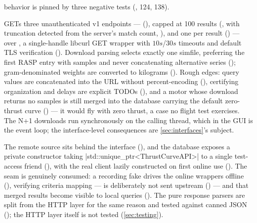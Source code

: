 \begin{description}
  behavior is pinned by three negative tests (, 124,
  138).
\item[thrustcurve.org REST --- \fpartial.]  GETs three unauthenticated v1
  endpoints ---  (),
   capped at 100 results (, with truncation
  detected from the server's match count, ), and one
   per result () --- over
  , a single-handle libcurl GET wrapper with $10\unit{s}$/$30\unit{s}$
  timeouts and default TLS verification (). Download parsing
  selects exactly one simfile, preferring the first RASP entry with samples and never concatenating
  alternative series (); gram-denominated weights are
  converted to kilograms (). Rough edges: query values are
  concatenated into the URL without percent-encoding (),
  certifying organization and delays are explicit TODOs (),
  and a motor whose download returns no samples is still merged into the database carrying the
  default zero-thrust curve () --- it would fly with zero
  thrust, a case no flight test exercises. The N+1 downloads run synchronously on the calling
  thread, which in the GUI is the event loop; the interface-level consequences are
  \cref{sec:interfaces}'s subject.
\end{description}

The remote source sits behind the  interface
(), and the database exposes a private constructor taking
\cppinline|std::unique_ptr<ThrustCurveAPI>| to a single test-access friend
(), with the real client lazily constructed on first online
use (). The seam is genuinely consumed: a recording fake
drives the online wrappers offline (), verifying
criteria mapping ---  is deliberately not sent upstream
() --- and that merged results become visible to local queries
(). The pure response parsers are split from the
HTTP layer for the same reason and tested against canned JSON
(); the HTTP layer itself is not tested
(\cref{sec:testing}).

